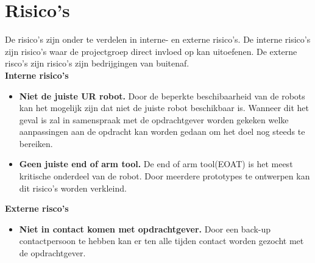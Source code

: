 \section{Risico's}

De risico's zijn onder te verdelen in interne- en externe risico's. De interne risico's zijn risico's waar de projectgroep direct invloed op kan uitoefenen. De externe risco's zijn risico's zijn bedrijgingen van buitenaf. \\[0.5cm]

\textbf{Interne risico's}
\begin{itemize}
	\item \textbf{Niet de juiste UR robot.} Door de beperkte beschibaarheid van de robots kan het mogelijk zijn dat niet de juiste robot beschikbaar is. Wanneer dit het geval is zal in samenspraak met de opdrachtgever worden gekeken welke aanpassingen aan de opdracht kan worden gedaan om het doel nog steeds te bereiken.
	\item \textbf{Geen juiste end of arm tool.} De end of arm tool(EOAT) is het meest kritische onderdeel van de robot. Door meerdere prototypes te ontwerpen kan dit risico's worden verkleind. 
\end{itemize}

\textbf{Externe risco's}
\begin{itemize}
	\item \textbf{Niet in contact komen met opdrachtgever.} Door een back-up contactpersoon te hebben kan er ten alle tijden contact worden gezocht met de opdrachtgever.

\end{itemize}



\newpage 